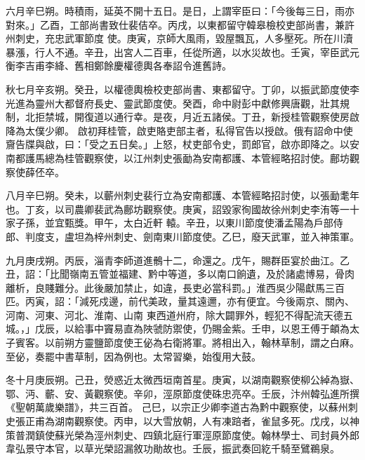 \begin{pinyinscope}
 六月辛巳朔。時積雨，延英不開十五日。是日，上謂宰臣曰：「今後每三日，雨亦對來。」乙酉，工部尚書致仕裴佶卒。丙戌，以東都留守韓皋檢校吏部尚書，兼許州刺史，充忠武軍節度
 使。庚寅，京師大風雨，毀屋飄瓦，人多壓死。所在川瀆暴漲，行人不通。辛丑，出宮人二百車，任從所適，以水災故也。壬寅，宰臣武元衡李吉甫李絳、舊相鄭餘慶權德輿各奉詔令進舊詩。



 秋七月辛亥朔。癸丑，以權德輿檢校吏部尚書、東都留守。丁卯，以振武節度使李光進為靈州大都督府長史、靈武節度使。癸酉，命中尉彭中獻修興唐觀，壯其規制，北拒禁城，開復道以通行幸。是夜，月近五諸侯。丁丑，新授桂管觀察使房啟降為太僕少卿。
 啟初拜桂管，啟吏賂吏部主者，私得官告以授啟。俄有詔命中使齎告牒與啟，曰：「受之五日矣。」上怒，杖吏部令史，罰郎官，啟亦即降之。以安南都護馬總為桂管觀察使，以江州刺史張勔為安南都護、本管經略招討使。鄜坊觀察使薛伾卒。



 八月辛巳朔。癸未，以蘄州刺史裴行立為安南都護、本管經略招討使，以張勔耄年也。丁亥，以司農卿裴武為鄜坊觀察使。庚寅，詔毀家徇國故徐州刺史李洧等一十家子孫，並宜甄獎。甲午，太白近軒
 轅。辛丑，以東川節度使潘孟陽為戶部侍郎、判度支，盧坦為梓州刺史、劍南東川節度使。乙巳，廢天武軍，並入神策軍。



 九月庚戌朔。丙辰，淄青李師道進鶻十二，命還之。戊午，賜群臣宴於曲江。乙丑，詔：「比聞嶺南五管並福建、黔中等道，多以南口餉遺，及於諸處博易，骨肉離析，良賤難分。此後嚴加禁止，如違，長吏必當科罰。」淮西吳少陽獻馬三百匹。丙寅，詔：「減死戍邊，前代美政，量其遠邇，亦有便宜。今後兩京、關內、河南、河東、河北、淮南、山南
 東西道州府，除大闢罪外，輕犯不得配流天德五城。，」戊辰，以給事中竇易直為陜虢防禦使，仍賜金紫。壬申，以恩王傅于頔為太子賓客。以前朔方靈鹽節度使王佖為右衛將軍。將相出入，翰林草制，謂之白麻。至佖，奏罷中書草制，因為例也。太常習樂，始復用大鼓。



 冬十月庚辰朔。己丑，熒惑近太微西垣南首星。庚寅，以湖南觀察使柳公綽為嶽、鄂、沔、蘄、安、黃觀察使。辛卯，涇原節度使硃忠亮卒。壬辰，汴州韓弘進所撰《聖朝萬歲樂譜》，共三百首。
 己巳，以宗正少卿李道古為黔中觀察使，以蘇州刺史張正甫為湖南觀察使。丙申，以大雪放朝，人有凍踣者，雀鼠多死。戊戌，以神策普潤鎮使蘇光榮為涇州刺史、四鎮北庭行軍涇原節度使。翰林學士、司封員外郎韋弘景守本官，以草光榮詔漏敘功勛故也。壬辰，振武奏回紇千騎至鷿鵜泉。




\end{pinyinscope}
